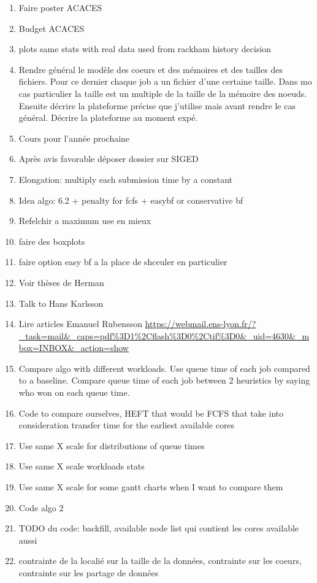 \documentclass[a4paper]{article}
\begin{document}
\begin{enumerate}
			\item Faire poster ACACES
			\item Budget ACACES
			\item plots same stats with real data used from rackham history decision
			\item Rendre général le modèle des coeurs et des mémoires et des tailles des fichiers. Pour ce dernier chaque job a un fichier d'une certaine taille. Dans mo cas particulier la taille est un multiple de la taille de la mémoire des noeuds. Ensuite décrire la plateforme précise que j'utilise mais avant rendre le cas général. Décrire la plateforme au moment expé.
			\item Cours pour l'année prochaine
			\item Après avis favorable déposer dossier sur SIGED
			\item Elongation: multiply each submission time by a constant
			\item Idea algo: 6.2 + penalty for fcfs + easybf or conservative bf
			\item Refelchir a maximum use en mieux
			\item faire des boxplots
			\item faire option easy bf a la place de shceuler en particulier
			\item Voir thèses de Herman
			\item Talk to Hans Karlsson
			\item Lire articles Emanuel Rubensson \url{https://webmail.ens-lyon.fr/?_task=mail&_caps=pdf%3D1%2Cflash%3D0%2Ctif%3D0&_uid=4630&_mbox=INBOX&_action=show}
			\item Compare algo with different workloads. Use queue time of each job compared to a baseline. Compare queue time of each job between 2 heuristics by saying who won on each queue time.
			\item Code to compare ourselves, HEFT that would be FCFS that take into consideration transfer time for the earliest available cores
			\item Use same X scale for distributions of queue times
			\item Use same X scale workloads stats
			\item Use same X scale for some gantt charts when I want to compare them
			\item Code algo 2
			\item TODO du code: backfill, available node list qui contient les cores available aussi
			\item contrainte de la localié sur la taille de la données, contrainte sur les coeurs, contrainte sur les partage de données

\end{enumerate}
\end{document}
